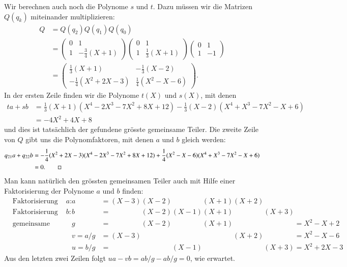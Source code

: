 \begin{beispiel}
Wir berechnen auch noch die Polynome $s$ und $t$.
Dazu müssen wir die Matrizen $Q(q_k)$ miteinander multiplizieren:
\begin{align*}
Q
&=Q(q_2) Q(q_1) Q(q_0)
\\
&=
\begin{pmatrix} 0 & 1 \\ 1 & -\frac34(X+1) \end{pmatrix}
\begin{pmatrix} 0 & 1 \\ 1 & \frac13(X+1) \end{pmatrix}
\begin{pmatrix} 0 & 1 \\ 1 & -1 \end{pmatrix}
\\
&=
\begin{pmatrix}
\frac13(X+1)&-\frac13(X-2)\\
-\frac14(X^2+2X-3)&\frac14(X^2-X-6)
\end{pmatrix}.
\end{align*}
In der ersten Zeile finden wir die Polynome $t(X)$ und $s(X)$, mit denen
\begin{align*}
ta+sb
&=
\frac13(X+1)
(X^4-2X^3-7X^2+8X+12)
-\frac13(X-2)
(X^4+X^3-7X^2-X+6)
\\
&=
-4X^2+4X+8
\end{align*}
und dies ist tatsächlich der gefundene grösste gemeinsame Teiler.
Die zweite Zeile von $Q$ gibt uns die Polynomfaktoren, mit denen
$a$ und $b$ gleich werden:
\begin{align*}
q_{21}a+q_{22}b
&=
-\frac14(X^2+2X-3)
(X^4-2X^3-7X^2+8X+12)
+\frac14(X^2-X-6)
(X^4+X^3-7X^2-X+6)
\\
&=0.
\qedhere
\end{align*}
Man kann natürlich den grössten gemeinsamen Teiler auch mit Hilfe einer
Faktorisierung der Polynome $a$ und $b$ finden:
\begin{align*}
&\text{Faktorisierung von $a$:}&
a  &=         (X-3) (X-2)\phantom{(X-1)}(X+1)         (X+2) \phantom{(X+3)}\\
&\text{Faktorisierung von $b$:}&
b  &=\phantom{(X-3)}(X-2)         (X-1) (X+1)\phantom{(X+2)}         (X+3) \\
&\text{gemeinsame Faktoren:}&
g  &=\phantom{(X-3)}(X-2)\phantom{(X-1)}(X+1)\phantom{(X+2)}\phantom{(X+3)}
    = X^2 -X + 2\\
&&
v=a/g&=         (X-3)\phantom{(X-2)(X-1)(X+1)} (X+2) \phantom{(X+3)}
    = X^2-X-6 \\
&&
u=b/g&=\phantom{(X-3)(X-2)} (X-1)\phantom{(X+1)(X+2)}(X+3)
    = X^2+2X-3
\end{align*}
Aus den letzten zwei Zeilen folgt
$ua-vb = ab/g - ab/g = 0$, wie erwartet.
\end{beispiel}

